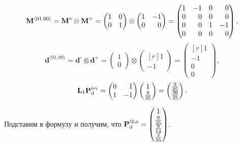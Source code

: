 \begin{equation*}
\M^{\langle 01, 00 \rangle} = \M^\circ \otimes \M^+ = 
\begin{pmatrix} 1 & 0 \\ 0 & 1\end{pmatrix} \otimes
\begin{pmatrix*}[r] 1 & -1 \\ 0 & 0 \end{pmatrix*} = 
\begin{pmatrix*}[r] 1 & -1 & 0  & 0 \\ 0 & 0 & 0 & 0 \\ 0 & 0 & 1 & -1 \\ 0 & 0 & 0 & 0 \end{pmatrix*},
\end{equation*}
\begin{equation*}
\mathbf{d}^{\langle 01, 00 \rangle} = \mathbf{d}^\circ \otimes \mathbf{d}^+ =
\begin{pmatrix} 1 \\ 0 \end{pmatrix} \otimes 
\begin{pmatrix*}[r] 1 \\ -1 \end{pmatrix*} = 
\begin{pmatrix*}[r]  1 \\ -1 \\ 0 \\ 0 \end{pmatrix*},
\end{equation*}
\begin{equation*}
\mathbf{L}_1\Pd^{\prime \ev} = \begin{pmatrix*}[r] 0 & 1 \\ 1 & -1 \end{pmatrix*} \begin{pmatrix}1 \\  \frac{9}{35} \end{pmatrix} = \begin{pmatrix}
\frac{9}{35} \\ \frac{26}{35} \end{pmatrix}.
\end{equation*}

Подставим в формулу и получим, что $\mathbf{P}_\mathrm{d}^{\prime 2,a} = \begin{pmatrix}
1 \\ \frac{9}{35} \\ \frac{9}{14} \\ \frac{3}{35}
\end{pmatrix}$.	

